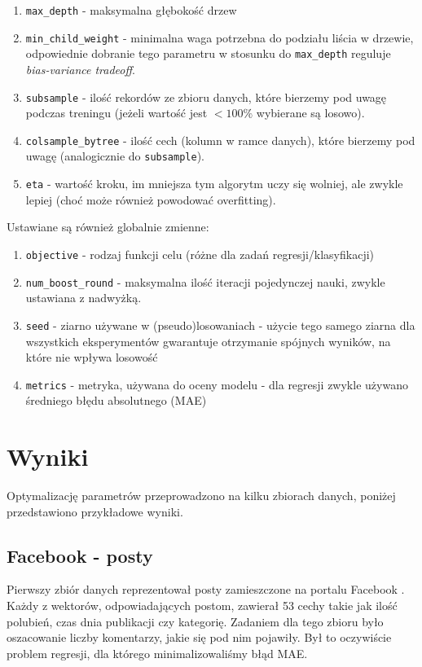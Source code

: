 \documentclass[a4paper,12p]{article}
\begin{document}
	\begin{enumerate}
		\item \texttt{max\_depth} - maksymalna głębokość drzew
		\item \texttt{min\_child\_weight} - minimalna waga potrzebna do podziału liścia w drzewie, odpowiednie dobranie tego parametru w stosunku do \texttt{max\_depth} reguluje \textit{bias-variance tradeoff}.
		\item \texttt{subsample} - ilość rekordów ze zbioru danych, które bierzemy pod uwagę podczas treningu (jeżeli wartość jest $< 100\%$ wybierane są losowo).
		\item \texttt{colsample\_bytree} - ilość cech (kolumn w ramce danych), które bierzemy pod uwagę (analogicznie do \texttt{subsample}).
		\item \texttt{eta} - wartość kroku, im mniejsza tym algorytm uczy się wolniej, ale zwykle lepiej (choć może również powodować overfitting).
	\end{enumerate}

	
	Ustawiane są również globalnie zmienne:
	
	\begin{enumerate}
		\item \texttt{objective} - rodzaj funkcji celu (różne dla zadań regresji/klasyfikacji)
		\item \texttt{num\_boost\_round} - maksymalna ilość iteracji pojedynczej nauki, zwykle ustawiana z nadwyżką.
		\item \texttt{seed} - ziarno używane w (pseudo)losowaniach  - użycie tego samego ziarna dla wszystkich eksperymentów gwarantuje otrzymanie spójnych wyników, na które nie wpływa losowość
		\item \texttt{metrics} - metryka, używana do oceny modelu - dla regresji zwykle używano średniego błędu absolutnego (MAE)
	\end{enumerate}
	
			
	\section{Wyniki}
	
	Optymalizację parametrów przeprowadzono na kilku zbiorach danych, poniżej przedstawiono przykładowe wyniki.	
	
	\subsection{Facebook - posty}
	
	Pierwszy zbiór danych reprezentował posty zamieszczone na portalu Facebook \cite{facebook}. Każdy z wektorów, odpowiadających postom, zawierał 53 cechy takie jak ilość polubień, czas dnia publikacji czy kategorię. Zadaniem dla tego zbioru było oszacowanie liczby komentarzy, jakie się pod nim pojawiły. Był to oczywiście problem regresji, dla którego minimalizowaliśmy błąd MAE.
	
\end{document}
